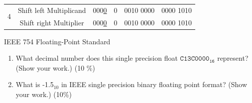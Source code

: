 \documentclass[12pt, a4paper]{article}
\begin{document}
\begin{ans}
\begin{center}
\begin{tabular}{|c|c|c|c|c|c|}
            \multirow{2}{*}{4}
                                & \multicolumn{1}{|c}{Shift left Multiplicand} & \multicolumn{1}{|c}{000\underline{0}} & \multicolumn{1}{|c}{0} & \multicolumn{1}{|c}{0010 0000} & \multicolumn{1}{|c|}{0000 1010} \\\cline{2-6}
                                & \multicolumn{1}{|c}{Shift right Multiplier} & \multicolumn{1}{|c}{000\underline{0}} & \multicolumn{1}{|c}{0} & \multicolumn{1}{|c}{0010 0000} & \multicolumn{1}{|c|}{0000 1010} \\\hline
        \end{tabular}
    \end{center}
\end{ans}
\pagebreak

\begin{q}{20}
    IEEE 754 Floating-Point Standard
    \begin{enumerate}
        \item What decimal number does this single precision float $\mathtt{C13C0000_{16}}$ represent? (Show your work.) (10 \%)
        \item What is -1.5$_{10}$ in IEEE single precision binary floating point format? (Show your work.) (10\%)
    \end{enumerate}
\end{q}
\end{document}
